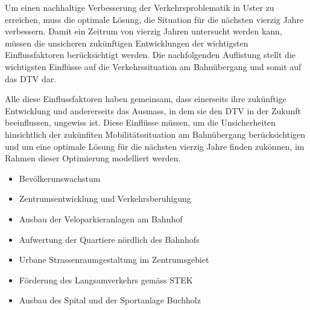 %
%
%
%



Um einen nachhaltige Verbesserung der Verkehrsproblematik in Uster zu erreichen, muss die optimale Lösung, die Situation für die nächsten vierzig Jahre verbessern. Damit ein Zeitrum von vierzig Jahren untersucht werden kann, müssen die unsicheren zukünftigen Entwicklungen der wichtigsten Einflussfaktoren berücksichtigt werden. Die nachfolgenden Auflistung stellt die wichtigsten Einflüsse auf die Verkehrssituation am Bahnübergang und somit auf das DTV dar. 

Alle diese Einflussfaktoren haben gemeinsam, dass einerseits ihre zukünftige Entwicklung und andererseits das Ausmass, in dem sie den DTV in der Zukunft beeinflussen, ungewiss ist. Diese Einflüsse müssen, um die Unsicherheiten hinsichtlich der zukünfiten Mobilitätssituation am Bahnübergang berücksichtigen und um eine optimale Lösung für die nächsten vierzig Jahre finden zukönnen, im Rahmen dieser Optimierung modelliert werden. 

{
\begin{itemize}
\item Bevölkerunswachstum
\item Zentrumsentwicklung und Verkehrsberuhigung
\item Ausbau der Veloparkieranlagen am Bahnhof 
\item Aufwertung der Quartiere nördlich des Bahnhofs
\item Urbane Strassenraumgestaltung im Zentrumsgebiet
\item Förderung des Langsamverkehrs gemäss STEK 
\item Ausbau des Spital und der Sportanlage Buchholz
\end{itemize}
}

